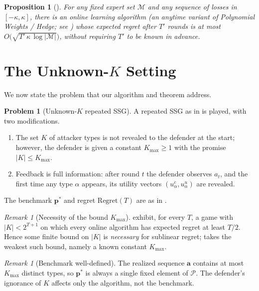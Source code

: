 \documentclass[letterpaper,9pt,twocolumn]{extarticle}
\newcommand{\pvec}{\mathbf{p}}
\newcommand{\avec}{\mathbf{a}}
\newcommand{\cP}{\mathcal{P}}
\newcommand{\cM}{\mathcal{M}}
\newcommand{\Kmax}{K_{\max}}
\newcommand{\Regret}{\mathrm{Regret}}
\theoremstyle{plain}
\newtheorem{proposition}[theorem]{Proposition}
\theoremstyle{definition}
\newtheorem{problem}[theorem]{Problem}
\theoremstyle{remark}
\newtheorem{remark}[theorem]{Remark}
\begin{document}
\begin{proposition}[{\citealp[Proposition 1]{balcan2015}}]
\label{prop:hedge}
For any fixed expert set $\cM$ and any sequence of losses in
$[-\kappa,\kappa]$, there is an online learning algorithm (an anytime
variant of Polynomial Weights / Hedge; see \citealp[\S 2]{cesa2006}) whose
expected regret after $T'$ rounds is at most
$O\bigl(\sqrt{T'\,\kappa\,\log|\cM|}\bigr)$, without requiring $T'$ to be
known in advance.
\end{proposition}

\section{The Unknown-$K$ Setting}
\label{sec:unknownK}

We now state the problem that our algorithm and theorem address.

\begin{problem}[Unknown-$K$ repeated SSG]\label{prob:unknownK}
A repeated SSG as in  is played, with two modifications.
\begin{enumerate}[leftmargin=1.2em,itemsep=0.05em,topsep=0.2em]
  \item The set $K$ of attacker types is not revealed to the defender at
  the start; however, the defender is given a constant $\Kmax\ge 1$ with
  the promise $|K|\le\Kmax$.
  \item Feedback is full information: after round $t$ the defender
  observes $a_t$, and the first time any type $\alpha$ appears, its
  utility vectors $(u_\alpha^c,u_\alpha^u)$ are revealed.
\end{enumerate}
The benchmark $\pvec^{*}$ and regret $\Regret(T)$ are as in
.
\end{problem}

\begin{remark}[Necessity of the bound $\Kmax$]\label{rem:necessity}
\citet[Theorem 7.1]{balcan2015} exhibit, for every $T$, a game with
$|K|<2^{T+1}$ on which every online algorithm has expected regret at
least $T/2$. Hence some finite bound on $|K|$ is \emph{necessary} for
sublinear regret;  takes the weakest such bound,
namely a known constant $\Kmax$.
\end{remark}

\begin{remark}[Benchmark well-defined]
The realized sequence $\avec$ contains at most $\Kmax$ distinct types,
so $\pvec^{*}$ is always a single fixed element of $\cP$. The defender's
ignorance of $K$ affects only the algorithm, not the benchmark.
\end{remark}
\end{document}
